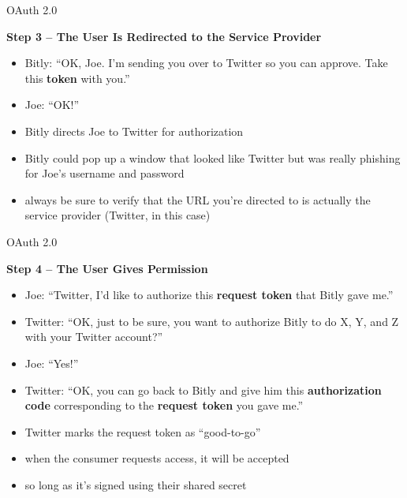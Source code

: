 \documentclass[pdf]{beamer}
\begin{document}
\begin{frame}{OAuth 2.0}

\textbf{Step 3 – The User Is Redirected to the Service Provider}

\begin{itemize}
\item
Bitly: “OK, Joe.  I’m sending you over to Twitter so you can approve.  Take this \textbf{token} with you.”
\newline

\item
Joe: “OK!”
\newline

\item
Bitly directs Joe to Twitter for authorization
\newline

\item
Bitly could pop up a window that looked like Twitter but was really phishing for Joe's username and password

\item
always be sure to verify that the URL you’re directed to is actually the service provider (Twitter, in this case)
\end{itemize}
\end{frame}



\begin{frame}{OAuth 2.0}

\textbf{Step 4 – The User Gives Permission}

\begin{itemize}
\item
Joe: “Twitter, I’d like to authorize this \textbf{request token} that Bitly gave me.”
\newline

\item
Twitter: “OK, just to be sure, you want to authorize Bitly to do X, Y, and Z with your Twitter account?”
\newline

\item
Joe: “Yes!”
\newline

\item
Twitter: “OK, you can go back to Bitly and give him this \textbf{authorization code} corresponding to the \textbf{request token} you gave me.”
\newline

\item
Twitter marks the request token as “good-to-go”

\item
when the consumer requests access, it will be accepted

\item
so long as it’s signed using their shared secret
\end{itemize}
\end{frame}
\end{document}
